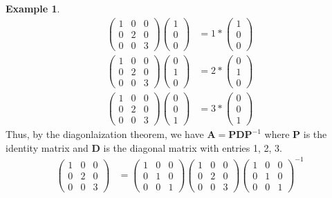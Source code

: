 \documentclass[
]{book}
\theoremstyle{definition}
\theoremstyle{definition}
\newtheorem{example}{Example}[chapter]
\theoremstyle{definition}
\theoremstyle{remark}
\begin{document}
\begin{example}
\[
\begin{aligned}
\begin{pmatrix} 1 & 0 & 0 \\ 0 & 2 & 0 \\ 0 & 0 & 3 \end{pmatrix} \begin{pmatrix} 1 \\ 0 \\ 0 \end{pmatrix} & = 1 * \begin{pmatrix} 1 \\ 0 \\ 0 \end{pmatrix} \\
\begin{pmatrix} 1 & 0 & 0 \\ 0 & 2 & 0 \\ 0 & 0 & 3 \end{pmatrix} \begin{pmatrix} 0 \\ 1 \\ 0 \end{pmatrix} & = 2 * \begin{pmatrix} 0 \\ 1 \\ 0 \end{pmatrix} \\
\begin{pmatrix} 1 & 0 & 0 \\ 0 & 2 & 0 \\ 0 & 0 & 3 \end{pmatrix} \begin{pmatrix} 0 \\ 0 \\ 1 \end{pmatrix} & = 3 * \begin{pmatrix} 0 \\ 0 \\ 1 \end{pmatrix} 
\end{aligned}
\]
Thus, by the diagonlaization theorem, we have \(\mathbf{A} = \mathbf{P} \mathbf{D} \mathbf{P}^{-1}\) where \(\mathbf{P}\) is the identity matrix and \(\mathbf{D}\) is the diagonal matrix with entries 1, 2, 3.
\[
\begin{aligned}
\begin{pmatrix} 1 & 0 & 0 \\ 0 & 2 & 0 \\ 0 & 0 & 3 \end{pmatrix} & = \begin{pmatrix} 1 & 0 & 0 \\ 0 & 1 & 0 \\ 0 & 0 & 1 \end{pmatrix} \begin{pmatrix} 1 & 0 & 0 \\ 0 & 2 & 0 \\ 0 & 0 & 3 \end{pmatrix} \begin{pmatrix} 1 & 0 & 0 \\ 0 & 1 & 0 \\ 0 & 0 & 1 \end{pmatrix}^{-1}

\end{aligned}\]
\end{example}
\end{document}
